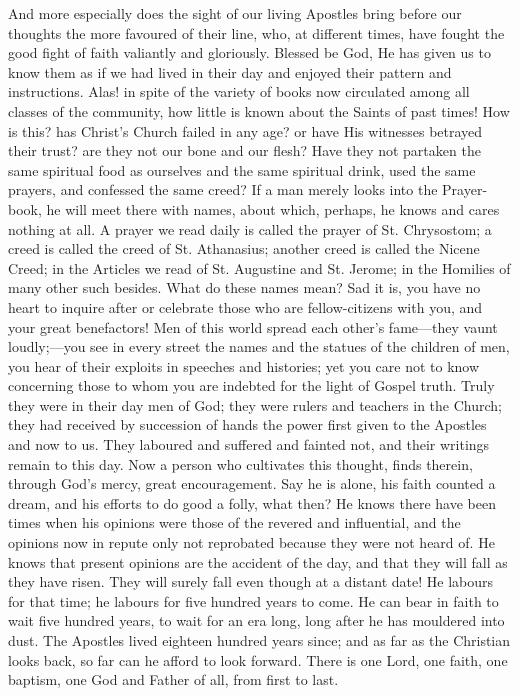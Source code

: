 And more especially does the sight of our living Apostles bring
before our thoughts the more favoured of their line, who, at different
times, have fought the good fight of faith valiantly and gloriously.
Blessed be God, He has given us to know them as if we had lived in
their day and enjoyed their pattern and instructions. Alas! in spite
of the variety of books now circulated among all classes of the
community, how little is known about the Saints of past times! How is
this? has Christ's Church failed in any age? or have His witnesses
betrayed their trust? are they not our bone and our flesh? Have they
not partaken the same spiritual food as ourselves and the same
spiritual drink, used the same prayers, and confessed the same creed?
If a man merely looks into the Prayer-book, he will meet there with
names, about which, perhaps, he knows and cares nothing at all. A
prayer we read daily is called the prayer of St. Chrysostom; a creed
is called the creed of St. Athanasius; another creed is called the
Nicene Creed; in the Articles we read of St. Augustine and St. Jerome;
in the Homilies of many other such besides. What do these names mean?
Sad it is, you have no heart to inquire after or celebrate those who
are fellow-citizens with you, and your great benefactors! Men of this
world spread each other's fame—they vaunt loudly;—you see in
every street the names and the statues of the children of men, you
hear of their exploits in speeches and histories; yet you care not to
know concerning those to whom you are indebted for the light of Gospel
truth. Truly they were in their day men of God; they were rulers and
teachers in the Church; they had received by succession of hands the
power first given to the Apostles and now to us. They laboured and
suffered and fainted not, and their writings remain to this day. Now a
person who cultivates this thought, finds therein, through God's
mercy, great encouragement. Say he is alone, his faith counted a
dream, and his efforts to do good a folly, what then? He knows there
have been times when his opinions were those of the revered and
influential, and the opinions now in repute only not reprobated
because they were not heard of. He knows that present opinions are the
accident of the day, and that they will fall as they have risen. They
will surely fall even though at a distant date! He labours for that
time; he labours for five hundred years to come. He can bear in faith
to wait five hundred years, to wait for an era long, long after he has
mouldered into dust. The Apostles lived eighteen hundred years since;
and as far as the Christian looks back, so far can he afford to look
forward. There is one Lord, one faith, one baptism, one God and Father
of all, from first to last.

